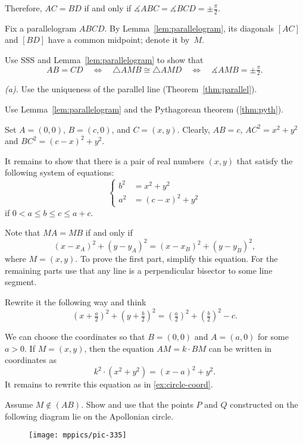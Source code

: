 Therefore, 
$AC=BD$
if and only if
$\measuredangle ABC
=\measuredangle BCD
=\pm\tfrac\pi2$.

Fix a parallelogram $ABCD$.
By Lemma~\ref{lem:parallelogram},
its diagonals $[AC]$ and $[BD]$ have a common midpoint; denote it by~$M$.

Use SSS and Lemma~\ref{lem:parallelogram} to show that
\[AB=CD
\quad
\iff
\quad
\triangle AMB
\cong
\triangle AMD
\quad
\iff
\quad
\measuredangle AMB
=
\pm\tfrac\pi2.\]

 \textit{(a).} Use the uniqueness of the parallel line (Theorem~\ref{thm:parallel}).

 Use Lemma~\ref{lem:parallelogram} and the Pythagorean theorem (\ref{thm:pyth}).

Set $A=(0,0)$, $B=(c,0)$, and $C=(x,y)$.
Clearly, $AB=c$,
$AC^2=x^2+y^2$ and $BC^2=(c-x)^2+y^2$.

It remains to show that there is a pair of real numbers $(x,y)$ 
that satisfy the following system of equations:
$$
\left\{
\begin{aligned}
b^2&=x^2+y^2
\\
a^2&=(c-x)^2+y^2
\end{aligned}
\right.
$$
if $0<a\le b\le c\le a+c$.

 Note that $MA=MB$ if and only if
\[(x-x_A)^2+(y-y_A)^2=(x-x_B)^2+(y-y_B)^2,\]
where $M=(x,y)$. 
To prove the first part, simplify this equation.
For the remaining parts use that any line is a perpendicular bisector to some line segment.

 Rewrite it the following way and think 
\[(x+\tfrac a2)^2+(y+\tfrac b2)^2=(\tfrac a2)^2+(\tfrac b2)^2-c.\]


We can choose the coordinates so that $B=(0,0)$ and $A=(a,0)$ for some $a>0$.
If $M=(x,y)$, then the equation $AM=k\cdot BM$ can be written in coordinates as 
\[k^2\cdot(x^2+y^2)=(x-a)^2+y^2.\]
It remains to rewrite this equation as in \ref{ex:circle-coord}.

Assume $M\notin(AB)$.
Show and use that the points $P$ and $Q$ constructed on the following diagram lie on the Apollonian circle.

\begin{figure}[!ht]
\centering
\texttt{[image: mppics/pic-335]}
\end{figure}



